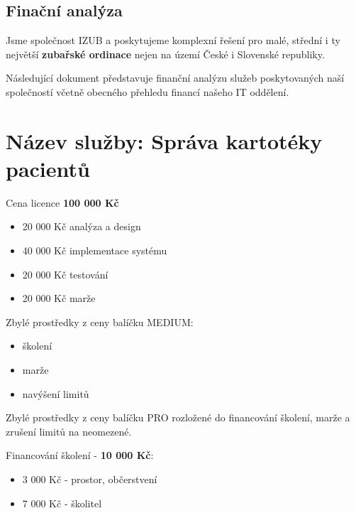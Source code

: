\documentclass[11pt, a4paper, titlepage]{article}
\begin{document}
	
	\pagestyle{fancy}

	\begin{center}
		\section*{Finační analýza}
	\end{center}

	\noindent Jsme společnost IZUB a poskytujeme komplexní řešení pro malé, střední i ty největší \textbf{zubařské ordinace} nejen na území České i Slovenské republiky.

	\vspace{0.5em}

	\noindent Následující dokument představuje finanční analýzu služeb poskytovaných naší společností včetně obecného přehledu financí našeho IT oddělení.

	\noindent\makebox[\linewidth]{\rule{17.5cm}{0.4pt}}

	\vspace{12pt}

	\section*{Název služby: Správa kartotéky pacientů}
	Cena licence \textbf{100 000 Kč}
	\begin{itemize}
		\item 20 000 Kč analýza a design
		\item 40 000 Kč implementace systému
		\item 20 000 Kč testování
		\item 20 000 Kč marže
	\end{itemize}
        Zbylé prostředky z ceny balíčku MEDIUM:
			\begin{itemize}
                \item školení
                \item marže
                \item navýšení limitů
            \end{itemize}
		Zbylé prostředky z ceny balíčku PRO rozložené do financování školení, marže a zrušení limitů na neomezené.

		Financování školení - \textbf{10 000 Kč}:
		\begin{itemize}
			\item 3 000 Kč - prostor, občerstvení
			\item 7 000 Kč - školitel
		\end{itemize}
\end{document}
